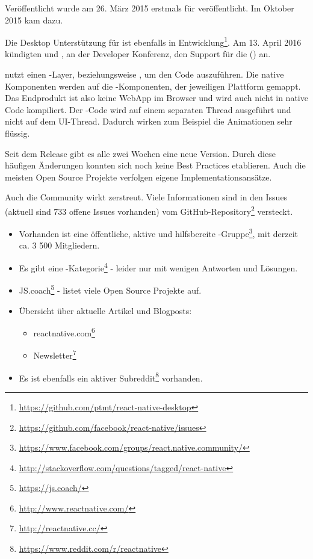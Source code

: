 Veröffentlicht wurde  am 26. März 2015 erstmals für  veröffentlicht.
Im Oktober 2015 kam  dazu.\cite{react-native-release}

Die Desktop Unterstützung für  ist ebenfalls in Entwicklung\footnote{\url{https://github.com/ptmt/react-native-desktop}}. 
Am 13. April 2016 kündigten  und , an der  Developer Konferenz, den Support für die  () an.\cite{react-native-windows} 

 nutzt einen -Layer, beziehungsweise , um den Code auszuführen.\cite{react-native-javascriptcore} 
Die native Komponenten werden auf die -Komponenten, der jeweiligen Plattform gemappt. 
Das Endprodukt ist also keine \gls{WebApp} im Browser und wird auch nicht in native Code kompiliert. 
Der -Code wird auf einem separaten Thread ausgeführt und nicht auf dem UI-Thread. 
Dadurch wirken zum Beispiel die Animationen sehr flüssig.\cite{react-native-javascript-thread}



Seit dem Release gibt es alle zwei Wochen eine neue Version. 
Durch diese häufigen Änderungen konnten sich noch keine Best Practices etablieren. 
Auch die meisten Open Source Projekte verfolgen eigene Implementationsansätze.

Auch die Community wirkt zerstreut. 
Viele Informationen sind in den Issues (aktuell sind 733 offene Issues vorhanden) vom  GitHub-Repository\footnote{\url{https://github.com/facebook/react-native/issues}}  versteckt.

\begin{itemize}
	\item Vorhanden ist eine öffentliche, aktive und hilfsbereite -Gruppe\footnote{\url{https://www.facebook.com/groups/react.native.community/}}, mit derzeit ca. 3 500 Mitgliedern.
	\item Es gibt eine -Kategorie\footnote{\url{http://stackoverflow.com/questions/tagged/react-native}} - leider nur mit wenigen Antworten und Lösungen.
	\item JS.coach\footnote{\url{https://js.coach/}} - listet viele Open Source Projekte auf.
	\item Übersicht über aktuelle Artikel und Blogposts: 
	\begin{itemize}
		\item reactnative.com\footnote{\url{http://www.reactnative.com/}}
		\item {} Newsletter\footnote{\url{http://reactnative.cc/}}
	\end{itemize}
	\item Es ist ebenfalls ein aktiver Subreddit\footnote{\url{https://www.reddit.com/r/reactnative}} vorhanden.
\end{itemize}



